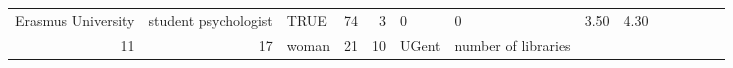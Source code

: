 \documentclass[]{svmono}
\theoremstyle{definition}
\theoremstyle{definition}
\theoremstyle{definition}
\theoremstyle{remark}
\begin{document}
\begin{longtable}[]{@{}rrlrrlllrrrrrr@{}}
\begin{minipage}[t]{0.09\columnwidth}
Erasmus University\strut
\end{minipage} & \begin{minipage}[t]{0.14\columnwidth}\raggedright\strut
student psychologist\strut
\end{minipage} & \begin{minipage}[t]{0.04\columnwidth}\raggedright\strut
TRUE\strut
\end{minipage} & \begin{minipage}[t]{0.02\columnwidth}\raggedleft\strut
74\strut
\end{minipage} & \begin{minipage}[t]{0.03\columnwidth}\raggedleft\strut
3\strut
\end{minipage} & \begin{minipage}[t]{0.05\columnwidth}\raggedleft\strut
0\strut
\end{minipage} & \begin{minipage}[t]{0.06\columnwidth}\raggedleft\strut
0\strut
\end{minipage} & \begin{minipage}[t]{0.04\columnwidth}\raggedleft\strut
3.50\strut
\end{minipage} & \begin{minipage}[t]{0.03\columnwidth}\raggedleft\strut
4.30\strut
\end{minipage}\tabularnewline
\begin{minipage}[t]{0.02\columnwidth}\raggedleft\strut
11\strut
\end{minipage} & \begin{minipage}[t]{0.03\columnwidth}\raggedleft\strut
17\strut
\end{minipage} & \begin{minipage}[t]{0.03\columnwidth}\raggedright\strut
woman\strut
\end{minipage} & \begin{minipage}[t]{0.02\columnwidth}\raggedleft\strut
21\strut
\end{minipage} & \begin{minipage}[t]{0.03\columnwidth}\raggedleft\strut
10\strut
\end{minipage} & \begin{minipage}[t]{0.09\columnwidth}\raggedright\strut
UGent\strut
\end{minipage} & \begin{minipage}[t]{0.14\columnwidth}\raggedright\strut
number of libraries\strut
\end{minipage} & \begin{minipage}[t]{0.04\columnwidth}\raggedright\strut

\end{minipage}
\end{longtable}
\end{document}
